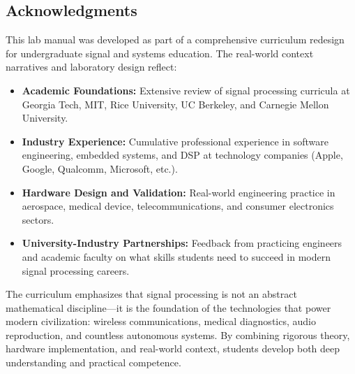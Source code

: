 \documentclass[11pt,letterpaper]{article}
\begin{document}
\subsection*{Acknowledgments}

This lab manual was developed as part of a comprehensive curriculum redesign for undergraduate signal and systems education. The real-world context narratives and laboratory design reflect:

\begin{itemize}
    \item \textbf{Academic Foundations:} Extensive review of signal processing curricula at Georgia Tech, MIT, Rice University, UC Berkeley, and Carnegie Mellon University.

    \item \textbf{Industry Experience:} Cumulative professional experience in software engineering, embedded systems, and DSP at technology companies (Apple, Google, Qualcomm, Microsoft, etc.).

    \item \textbf{Hardware Design and Validation:} Real-world engineering practice in aerospace, medical device, telecommunications, and consumer electronics sectors.

    \item \textbf{University-Industry Partnerships:} Feedback from practicing engineers and academic faculty on what skills students need to succeed in modern signal processing careers.
\end{itemize}

The curriculum emphasizes that signal processing is not an abstract mathematical discipline—it is the foundation of the technologies that power modern civilization: wireless communications, medical diagnostics, audio reproduction, and countless autonomous systems. By combining rigorous theory, hardware implementation, and real-world context, students develop both deep understanding and practical competence.
\end{document}
